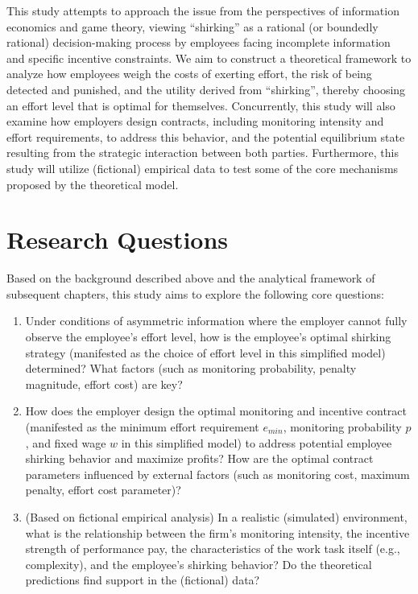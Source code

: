 This study attempts to approach the issue from the perspectives of {information economics} and {game theory}, viewing \enquote{shirking} as a rational (or boundedly rational) decision-making process by employees facing incomplete information and specific incentive constraints. We aim to construct a theoretical framework to analyze how employees weigh the costs of exerting effort, the risk of being detected and punished, and the utility derived from \enquote{shirking}, thereby choosing an effort level that is optimal for themselves. Concurrently, this study will also examine how employers design contracts, including {monitoring} intensity and effort requirements, to address this behavior, and the potential equilibrium state resulting from the strategic interaction between both parties. Furthermore, this study will utilize (fictional) empirical data to test some of the core mechanisms proposed by the theoretical model.

\section{Research Questions}

Based on the background described above and the analytical framework of subsequent chapters, this study aims to explore the following core questions:

\begin{enumerate}
    \item Under conditions of asymmetric information where the employer cannot fully observe the employee's effort level, how is the employee's {optimal shirking} strategy (manifested as the choice of effort level in this simplified model) determined? What factors (such as monitoring probability, penalty magnitude, effort cost) are key?
    \item How does the employer design the optimal {monitoring} and {incentive} contract (manifested as the minimum effort requirement $e_{min}$, monitoring probability $p$, and fixed wage $w$ in this simplified model) to address potential employee {shirking} behavior and maximize profits? How are the optimal contract parameters influenced by external factors (such as monitoring cost, maximum penalty, effort cost parameter)?
    \item (Based on fictional empirical analysis) In a realistic (simulated) environment, what is the relationship between the firm's monitoring intensity, the incentive strength of performance pay, the characteristics of the work task itself (e.g., complexity), and the employee's {shirking} behavior? Do the theoretical predictions find support in the (fictional) data?
\end{enumerate}

